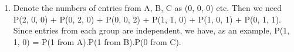 \documentclass[a4paper,12pt]{article}
\begin{document}
\begin{enumerate}
\begin{eqnarray*}
P(1\mbox{ entry in total}) &=& P([1,0,0]) + P([0,1,0]) + P([0,0,1])\\
&=& \left[ 0.5 \times 0.4219 \times 0.327  \right] + 
\left[ 0.5 \times 0.4219 \times 0.327   \right] + 
\left[ 0.5 \times 0.4219 \times 0.4096   \right] 
\end{eqnarray*}

[If worked in decimals, this is 0.1469.]

\begin{eqnarray*}
P(1 \mbox{ from } A | 1 in total) &=& \frac{P(\mbox{1 \mbox{ from } A and 1 in total})}{ P(1 in total)}\\
&=& \frac{P(\mbox{1 \mbox{ from } A, 0 from B and C}) }{P(1 in total)} \\
&=& 271024126431254593125817××=.\\
\end{eqnarray*}


\item  Denote the numbers of entries from A, B, C as (0, 0, 0) etc. Then we need P(2, 0, 0) + P(0, 2, 0) + P(0, 0, 2) + P(1, 1, 0) + P(1, 0, 1) + P(0, 1, 1). Since entries from each group are independent, we have, as an example, P(1, 1, 0) = P(1 from A).P(1 from B).P(0 from C).
\end{enumerate}
\end{document}
